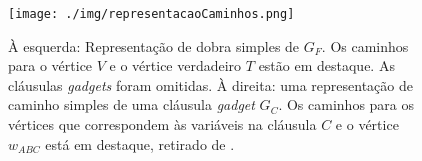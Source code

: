 \begin{figure}[htb]	
\center%
\texttt{[image: ./img/representacaoCaminhos.png]}
\caption{À esquerda: Representação de dobra simples de $G_{F}$. Os caminhos para o vértice $V$ e o vértice verdadeiro $T$ estão em destaque. As cláusulas \textit{gadgets} foram omitidas. À direita: uma representação de caminho simples de uma cláusula \textit{gadget} $G_{C}$. Os caminhos para os vértices que correspondem às variáveis na cláusula $C$ e o vértice $w_{ABC}$ está em destaque, retirado de \cite{heldt2014}.}
\label{fig:representacaoCaminhos}
\end{figure}